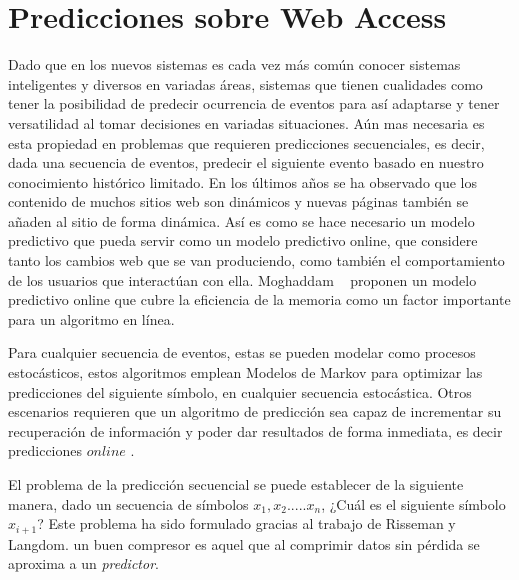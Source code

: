 \chapter[Predicciones sobre Web Access]{Predicciones sobre Web Access}\label{ch:predicciones-webaccess}





Dado que en los nuevos sistemas es cada vez más común conocer sistemas inteligentes y diversos en variadas áreas, sistemas que tienen cualidades como tener la posibilidad de predecir ocurrencia de eventos para así adaptarse y tener versatilidad al tomar decisiones en variadas situaciones. Aún mas necesaria es esta propiedad en problemas que requieren predicciones secuenciales, es decir, dada una secuencia de eventos,  predecir el siguiente evento basado en nuestro conocimiento histórico limitado.
En los últimos años se ha observado que  los contenido de muchos sitios web son dinámicos y nuevas páginas también se añaden al sitio de forma dinámica. Así es como  se hace necesario un modelo predictivo que pueda servir como un modelo predictivo online,  que considere tanto los cambios web que se van produciendo, como también el comportamiento de los usuarios que interactúan con ella. 
Moghaddam \etal~\cite{Moghaddam2009} proponen un modelo predictivo online que cubre la eficiencia de la memoria como un factor importante para un algoritmo en línea. 

Para cualquier secuencia de eventos, estas se pueden modelar como procesos estocásticos, estos algoritmos emplean Modelos de Markov para optimizar las predicciones del siguiente símbolo, en cualquier secuencia estocástica. Otros escenarios requieren que un algoritmo de predicción sea capaz de incrementar su recuperación de información  y poder dar resultados de forma inmediata, es decir predicciones $online$ .

El problema de la predicción secuencial se puede establecer de la siguiente manera, dado un secuencia de símbolos $x_{1}, x_{2}.....x_{n}$, ¿Cuál es el siguiente símbolo $x_{i+1}$? Este problema ha sido formulado gracias al trabajo de  Risseman\cite{Rissanen1983} y Langdom\cite{Langdon1983}.  %
un buen compresor es aquel que al comprimir datos sin pérdida se aproxima a un \emph{predictor}.

